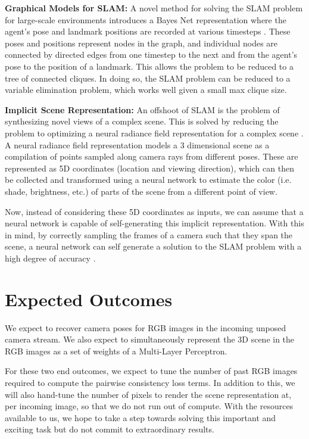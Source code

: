 \documentclass[15pt,letterpaper]{article}
\begin{document}
{\bf Graphical Models for SLAM:}
A novel method for solving the SLAM problem for large-scale environments introduces a Bayes Net representation where the agent's pose and landmark positions are recorded at various timesteps \cite{isam2}. These poses and positions represent nodes in the graph, and individual nodes are connected by directed edges from one timestep to the next and from the agent's pose to the position of a landmark. This allows the problem to be reduced to a tree of connected cliques. In doing so, the SLAM problem can be reduced to a variable elimination problem, which works well given a small max clique size.

{\bf Implicit Scene Representation:}
An offshoot of SLAM is the problem of synthesizing novel views of a complex scene. This is solved by reducing the problem to optimizing a neural radiance field representation for a complex scene \cite{nerf}. A neural radiance field representation models a 3 dimensional scene as a compilation of points sampled along camera rays from different poses. These are represented as 5D coordinates (location and viewing direction), which can then be collected and transformed using a neural network to estimate the color (i.e. shade, brightness, etc.) of parts of the scene from a different point of view.

Now, instead of considering these 5D coordinates as inputs, we can assume that a neural network is capable of self-generating this implicit representation. With this in mind, by correctly sampling the frames of a camera such that they span the scene, a neural network can self generate a solution to the SLAM problem with a high degree of accuracy \cite{imap}.

\section{Expected Outcomes}%
\label{sec:Expected Outcomes}
We expect to recover camera poses for RGB images in the incoming unposed camera stream. We also expect to simultaneously represent the 3D scene in the RGB images as a set of weights of a Multi-Layer Perceptron.

For these two end outcomes, we expect to tune the number of past RGB images required to compute the pairwise consistency loss terms. In addition to this, we will also hand-tune the number of pixels to render the scene representation at, per incoming image, so that we do not run out of compute. With the resources available to us, we hope to take a step towards solving this important and exciting task but do not commit to extraordinary results.
\end{document}
